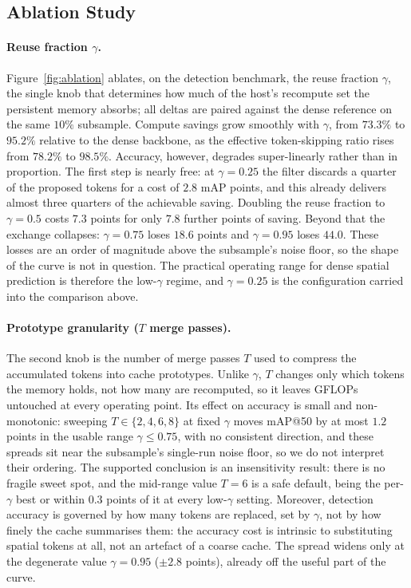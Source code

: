 \subsection{Ablation Study}
\label{sec:eval-ablation}

\paragraph{Reuse fraction $\gamma$.}
Figure~\ref{fig:ablation} ablates, on the detection benchmark, the reuse
fraction $\gamma$, the single knob that determines how much of the
host's recompute set the persistent memory absorbs; all deltas are
paired against the dense reference on the same $10\%$ subsample. Compute
savings grow smoothly with $\gamma$, from $73.3\%$ to $95.2\%$ relative
to the dense backbone, as the effective token-skipping ratio rises from
$78.2\%$ to $98.5\%$. Accuracy, however, degrades super-linearly rather
than in proportion. The first step is nearly free: at $\gamma = 0.25$
the filter discards a quarter of the proposed tokens for a cost of $2.8$
mAP points, and this already delivers almost three quarters of the
achievable saving. Doubling the reuse fraction to $\gamma = 0.5$ costs
$7.3$ points for only $7.8$ further points of saving. Beyond that the
exchange collapses: $\gamma = 0.75$ loses $18.6$ points and
$\gamma = 0.95$ loses $44.0$. These losses are an order of magnitude
above the subsample's noise floor, so the shape of the curve is not in
question. The practical operating range for dense
spatial prediction is therefore the low-$\gamma$ regime, and
$\gamma = 0.25$ is the configuration carried into the comparison above.

\paragraph{Prototype granularity ($T$ merge passes).}
The second knob is the number of merge passes $T$ used to compress the
accumulated tokens into cache prototypes. Unlike $\gamma$, $T$ changes
only which tokens the memory holds, not how many are recomputed, so it
leaves GFLOPs untouched at every operating point. Its effect on accuracy
is small and non-monotonic: sweeping $T \in \{2,4,6,8\}$ at fixed
$\gamma$ moves mAP@50 by at most $1.2$ points in the usable range
$\gamma \le 0.75$, with no consistent direction, and these spreads sit
near the subsample's single-run noise floor, so we do not interpret
their ordering. The supported conclusion is an insensitivity result:
there is no fragile sweet spot, and the mid-range value $T = 6$ is a
safe default, being the per-$\gamma$ best or within $0.3$ points of it
at every low-$\gamma$ setting. Moreover, detection accuracy is governed
by how many tokens are replaced, set by $\gamma$, not by how finely the
cache summarises them: the accuracy cost is intrinsic to substituting
spatial tokens at all, not an artefact of a coarse cache. The spread
widens only at the degenerate value $\gamma = 0.95$ ($\pm 2.8$ points),
already off the useful part of the curve.

